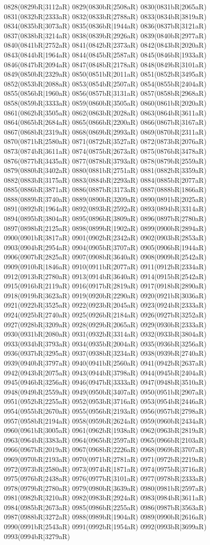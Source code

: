0828(0829bR|3112aR) 0829(0830bR|2508aR) 0830(0831bR|2065aR) 0831(0832bR|2333aR) 0832(0833bR|2788aR) 0833(0834bR|3819aR) 0834(0835bR|3073aR) 0835(0836bR|1944aR) 0836(0837bR|3121aR) 0837(0838bR|3214aR) 0838(0839bR|2926aR) 0839(0840bR|2977aR) 0840(0841bR|2752aR) 0841(0842bR|2373aR) 0842(0843bR|2020aR) 0843(0844bR|1964aR) 0844(0845bR|2587aR) 0845(0846bR|1933aR) 0846(0847bR|2094aR) 0847(0848bR|2178aR) 0848(0849bR|3101aR) 0849(0850bR|2329aR) 0850(0851bR|2011aR) 0851(0852bR|3495aR) 0852(0853bR|2088aR) 0853(0854bR|2507aR) 0854(0855bR|2404aR) 0855(0856bR|1960aR) 0856(0857bR|3131aR) 0857(0858bR|2968aR) 0858(0859bR|3333aR) 0859(0860bR|3505aR) 0860(0861bR|2020aR) 0861(0862bR|3505aR) 0862(0863bR|2028aR) 0863(0864bR|3611aR) 0864(0865bR|2684aR) 0865(0866bR|2200aR) 0866(0867bR|3167aR) 0867(0868bR|2319aR) 0868(0869bR|2993aR) 0869(0870bR|2311aR) 0870(0871bR|2580aR) 0871(0872bR|3527aR) 0872(0873bR|2076aR) 0873(0874bR|3611aR) 0874(0875bR|2673aR) 0875(0876bR|3478aR) 0876(0877bR|3435aR) 0877(0878bR|3793aR) 0878(0879bR|2559aR) 0879(0880bR|3402aR) 0880(0881bR|2751aR) 0881(0882bR|3359aR) 0882(0883bR|3175aR) 0883(0884bR|2293aR) 0884(0885bR|2077aR) 0885(0886bR|3871aR) 0886(0887bR|3173aR) 0887(0888bR|1866aR) 0888(0889bR|3740aR) 0889(0890bR|3209aR) 0890(0891bR|2025aR) 0891(0892bR|1964aR) 0892(0893bR|2592aR) 0893(0894bR|3314aR) 0894(0895bR|3804aR) 0895(0896bR|3809aR) 0896(0897bR|2780aR) 0897(0898bR|2125aR) 0898(0899bR|1902aR) 0899(0900bR|2894aR) 0900(0901bR|3817aR) 0901(0902bR|2342aR) 0902(0903bR|2853aR) 0903(0904bR|2954aR) 0904(0905bR|3707aR) 0905(0906bR|1944aR) 0906(0907bR|2825aR) 0907(0908bR|3640aR) 0908(0909bR|2542aR) 0909(0910bR|1846aR) 0910(0911bR|2077aR) 0911(0912bR|2334aR) 0912(0913bR|2780aR) 0913(0914bR|3640aR) 0914(0915bR|2542aR) 0915(0916bR|2119aR) 0916(0917bR|2819aR) 0917(0918bR|2890aR) 0918(0919bR|3623aR) 0919(0920bR|2290aR) 0920(0921bR|3036aR) 0921(0922bR|3525aR) 0922(0923bR|2045aR) 0923(0924bR|2333aR) 0924(0925bR|2740aR) 0925(0926bR|2184aR) 0926(0927bR|3252aR) 0927(0928bR|3209aR) 0928(0929bR|2065aR) 0929(0930bR|2333aR) 0930(0931bR|2080aR) 0931(0932bR|3314aR) 0932(0933bR|3804aR) 0933(0934bR|3793aR) 0934(0935bR|2004aR) 0935(0936bR|3256aR) 0936(0937bR|3295aR) 0937(0938bR|3234aR) 0938(0939bR|2740aR) 0939(0940bR|3797aR) 0940(0941bR|2560aR) 0941(0942bR|2637aR) 0942(0943bR|2075aR) 0943(0944bR|3798aR) 0944(0945bR|2404aR) 0945(0946bR|3256aR) 0946(0947bR|3333aR) 0947(0948bR|3510aR) 0948(0949bR|2559aR) 0949(0950bR|3407aR) 0950(0951bR|2907aR) 0951(0952bR|2255aR) 0952(0953bR|3716aR) 0953(0954bR|2446aR) 0954(0955bR|2670aR) 0955(0956bR|2193aR) 0956(0957bR|2798aR) 0957(0958bR|2194aR) 0958(0959bR|2624aR) 0959(0960bR|2434aR) 0960(0961bR|3005aR) 0961(0962bR|1938aR) 0962(0963bR|2819aR) 0963(0964bR|3383aR) 0964(0965bR|2597aR) 0965(0966bR|2103aR) 0966(0967bR|2019aR) 0967(0968bR|2226aR) 0968(0969bR|3707aR) 0969(0970bR|2193aR) 0970(0971bR|2781aR) 0971(0972bR|2219aR) 0972(0973bR|2580aR) 0973(0974bR|1871aR) 0974(0975bR|3716aR) 0975(0976bR|2438aR) 0976(0977bR|3101aR) 0977(0978bR|2333aR) 0978(0979bR|2780aR) 0979(0980bR|3639aR) 0980(0981bR|2597aR) 0981(0982bR|3210aR) 0982(0983bR|2924aR) 0983(0984bR|3611aR) 0984(0985bR|2673aR) 0985(0986bR|2255aR) 0986(0987bR|3563aR) 0987(0988bR|3272aR) 0988(0989bR|1904aR) 0989(0990bR|2616aR) 0990(0991bR|2543aR) 0991(0992bR|1954aR) 0992(0993bR|3699aR) 0993(0994bR|3279aR) 